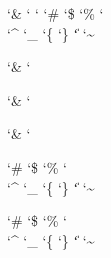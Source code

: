 \startcatcodetable \xmlcatcodesr
    \catcode\tabasciicode      \spacecatcode
    \catcode\endoflineasciicode\endoflinecatcode
    \catcode\formfeedasciicode \endoflinecatcode
    \catcode\spaceasciicode    \spacecatcode
    \catcode\endoffileasciicode\ignorecatcode
    \catcode`\&                \activecatcode
    \catcode`\<                \activecatcode
    \catcode`\>                \activecatcode
    \catcode`\#                \activecatcode
    \catcode`\$                \activecatcode
    \catcode`\%                \activecatcode
    \catcode`\\                \activecatcode
    \catcode`\^                \activecatcode
    \catcode`\_                \activecatcode
    \catcode`\{                \activecatcode
    \catcode`\}                \activecatcode
    \catcode`\|                \activecatcode
    \catcode`\~                \activecatcode
\stopcatcodetable


 \xmlcatcodesn `\&   \relax
{} \xmlcatcodesn `\<   \relax

 \xmlcatcodese `\&   \relax
{} \xmlcatcodese `\<   \relax

 \xmlcatcodesr `\&   \relax
{} \xmlcatcodesr `\<   \relax

 \xmlcatcodese `\#   \relax
{} \xmlcatcodese `\$   \relax
{} \xmlcatcodese `\%   \relax
{} \xmlcatcodese `\\   \relax
{} \xmlcatcodese `\^   \relax
{} \xmlcatcodese `\_   \relax
{} \xmlcatcodese `\{   \relax
{} \xmlcatcodese `\}   \relax
{} \xmlcatcodese `\|   \relax
{} \xmlcatcodese `\~   \relax

 \xmlcatcodesr `\#   \relax
{} \xmlcatcodesr `\$   \relax
{} \xmlcatcodesr `\%   \relax
{} \xmlcatcodesr `\\   \relax
{} \xmlcatcodesr `\^   \relax
{} \xmlcatcodesr `\_   \relax
{} \xmlcatcodesr `\{   \relax
{} \xmlcatcodesr `\}   \relax
{} \xmlcatcodesr `\|   \relax
{} \xmlcatcodesr `\~   \relax

\let\xmlcatcodes   \xmlcatcodesn %

